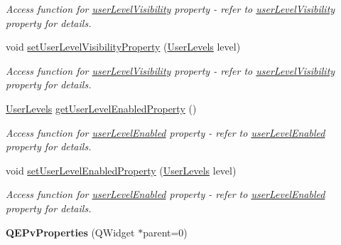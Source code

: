 \begin{DoxyCompactItemize}
\begin{DoxyCompactList}\small\item\em Access function for \hyperlink{classQEPvProperties_ab298719b9ac151954f8ce9c9586f887f}{userLevelVisibility} property -\/ refer to \hyperlink{classQEPvProperties_ab298719b9ac151954f8ce9c9586f887f}{userLevelVisibility} property for details. \end{DoxyCompactList}\item 
\hypertarget{classQEPvProperties_a961ff182708058ae33f2d6529ef699b8}{
void \hyperlink{classQEPvProperties_a961ff182708058ae33f2d6529ef699b8}{setUserLevelVisibilityProperty} (\hyperlink{classQEPvProperties_affb354a03ed5e2905586fad96fd9cb32}{UserLevels} level)}
\label{classQEPvProperties_a961ff182708058ae33f2d6529ef699b8}

\begin{DoxyCompactList}\small\item\em Access function for \hyperlink{classQEPvProperties_ab298719b9ac151954f8ce9c9586f887f}{userLevelVisibility} property -\/ refer to \hyperlink{classQEPvProperties_ab298719b9ac151954f8ce9c9586f887f}{userLevelVisibility} property for details. \end{DoxyCompactList}\item 
\hypertarget{classQEPvProperties_ac068683236182e732d52c15e9483ccf3}{
\hyperlink{classQEPvProperties_affb354a03ed5e2905586fad96fd9cb32}{UserLevels} \hyperlink{classQEPvProperties_ac068683236182e732d52c15e9483ccf3}{getUserLevelEnabledProperty} ()}
\label{classQEPvProperties_ac068683236182e732d52c15e9483ccf3}

\begin{DoxyCompactList}\small\item\em Access function for \hyperlink{classQEPvProperties_af97fe8a974987d11ba381862c9688797}{userLevelEnabled} property -\/ refer to \hyperlink{classQEPvProperties_af97fe8a974987d11ba381862c9688797}{userLevelEnabled} property for details. \end{DoxyCompactList}\item 
\hypertarget{classQEPvProperties_a2dd6dbae43dffa5511fde8585b7a42ba}{
void \hyperlink{classQEPvProperties_a2dd6dbae43dffa5511fde8585b7a42ba}{setUserLevelEnabledProperty} (\hyperlink{classQEPvProperties_affb354a03ed5e2905586fad96fd9cb32}{UserLevels} level)}
\label{classQEPvProperties_a2dd6dbae43dffa5511fde8585b7a42ba}

\begin{DoxyCompactList}\small\item\em Access function for \hyperlink{classQEPvProperties_af97fe8a974987d11ba381862c9688797}{userLevelEnabled} property -\/ refer to \hyperlink{classQEPvProperties_af97fe8a974987d11ba381862c9688797}{userLevelEnabled} property for details. \end{DoxyCompactList}\item 
\hypertarget{classQEPvProperties_a901cace1e45c2df01932a2e46b94b4cd}{
{\bfseries QEPvProperties} (QWidget $\ast$parent=0)}
\label{classQEPvProperties_a901cace1e45c2df01932a2e46b94b4cd}


\end{DoxyCompactItemize}
